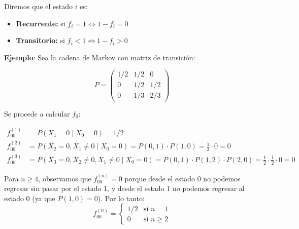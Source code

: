 \documentclass[12pt,a4paper]{article}
\begin{document}
Diremos que el estado $i$ es:

\begin{itemize}
    \item \textbf{Recurrente:} si $f_i = 1 \iff 1 - f_i = 0$
    \item \textbf{Transitorio:} si $f_i < 1 \iff 1 - f_i > 0$
\end{itemize}

\textbf{Ejemplo}: Sea la cadena de Markov con matriz de transición:

\begin{equation*}
P = \begin{pmatrix}
1/2 & 1/2 & 0 \\
0 & 1/2 & 1/2 \\
0 & 1/3 & 2/3
\end{pmatrix}
\end{equation*}

\begin{center}
\end{center}

Se procede a calcular $f_0$:

\begin{align*}
f_{00}^{(1)} &= P(X_1=0 \mid X_0=0) = 1/2 \\
f_{00}^{(2)} &= P(X_2=0, X_1 \neq 0 \mid X_0=0) = P(0,1) \cdot P(1,0) = \frac{1}{2} \cdot 0 = 0 \\
f_{00}^{(3)} &= P(X_3=0, X_2 \neq 0, X_1 \neq 0 \mid X_0=0) = P(0,1) \cdot P(1,2) \cdot P(2,0) = \frac{1}{2} \cdot \frac{1}{2} \cdot 0 = 0
\end{align*}

Para $n \geq 4$, observamos que $f_{00}^{(n)} = 0$ porque desde el estado 0 no podemos regresar sin pasar por el estado 1, y desde el estado 1 no podemos regresar al estado 0 (ya que $P(1,0) = 0$). Por lo tanto:
\begin{equation*}
f_{00}^{(n)} = \begin{cases}
1/2 & \text{si } n = 1 \\
0 & \text{si } n \geq 2
\end{cases}
\end{equation*}
\end{document}
